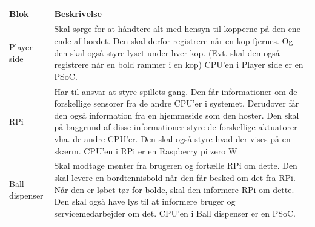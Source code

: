\documentclass[Arkitektur/System_main.tex]{subfiles}
\begin{document}
\begin{table}[H]
\begin{tabular}{L{0.2\columnwidth}|L{0.8\columnwidth}}
\hline
\textbf{Blok} & \textbf{Beskrivelse} \\ \hline
Player side & Skal sørge for at håndtere alt med hensyn til kopperne på den ene ende af bordet. Den skal derfor registrere når en kop fjernes. Og den skal også styre lyset under hver kop. (Evt. skal den også registrere når en bold rammer i en kop) \newline CPU'en i Player side er en PSoC. \\ \hline
RPi & Har til ansvar at styre spillets gang. Den får informationer om de forskellige sensorer fra de andre CPU'er i systemet. Derudover får den også information fra en hjemmeside som den hoster. Den skal på baggrund af disse informationer styre de forskellige aktuatorer vha. de andre CPU'er. Den skal også styre hvad der vises på en skærm. \newline CPU'en i RPi er en Raspberry pi zero W  \\ \hline
Ball dispenser & Skal modtage mønter fra brugeren og fortælle RPi om dette. Den skal levere en bordtennisbold når den får besked om det fra RPi. Når den er løbet tør for bolde, skal den informere RPi om dette. Den skal også have lys til at informere bruger og servicemedarbejder om det. \newline CPU'en i Ball dispenser er en PSoC.  \\ \hline
\end{tabular}
\end{table}
\end{document}
